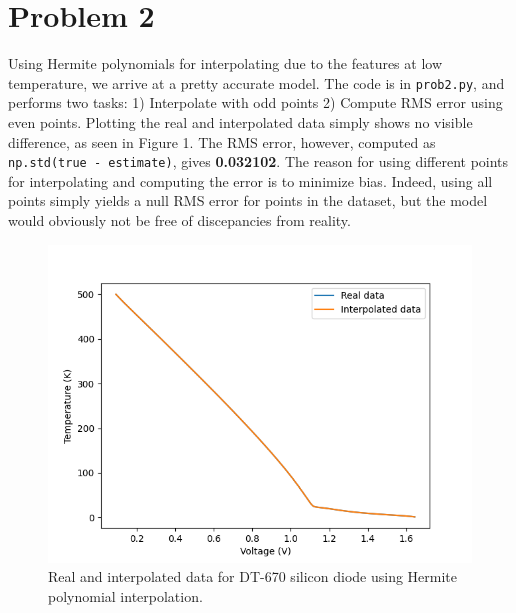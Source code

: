 \documentclass{article}
\begin{document}
\newpage
\section*{Problem 2}
Using Hermite polynomials for interpolating due to the features at low temperature, we arrive at a pretty accurate model. The code is in \verb|prob2.py|, and performs two tasks: 1) Interpolate with odd points 2) Compute RMS error using even points. Plotting the real and interpolated data simply shows no visible difference, as seen in Figure 1. The RMS error, however, computed as \verb|np.std(true - estimate)|, gives \textbf{0.032102}. The reason for using different points for interpolating and computing the error is to minimize bias. Indeed, using all points simply yields a null RMS error for points in the dataset, but the model would obviously not be free of discepancies from reality.

\begin{figure}[h]
    \centering
    \includegraphics[scale=0.8]{images/prob2_lakeshore_interp}
    \caption{Real and interpolated data for DT-670 silicon diode using Hermite polynomial interpolation.}
\end{figure}

\newpage
\end{document}
